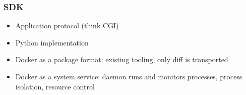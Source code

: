 \documentclass{beamer}
\begin{document}
  \begin{frame}
  	\frametitle{SDK}
  	\begin{itemize}
    	\item Application protocol (think CGI)
    	\item Python implementation
    	\item Docker as a package format: existing tooling, only diff is transported
    	\item Docker as a system service: daemon runs and monitors processes, process isolation, resource control
    \end{itemize}
  \end{frame}

  
\end{document}

